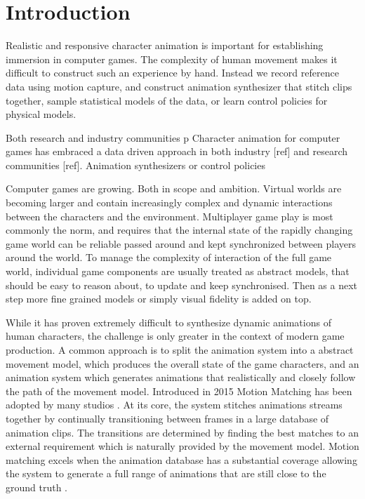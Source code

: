 \section{Introduction}
Realistic and responsive character animation is important for establishing immersion in computer games. The complexity of human movement makes it difficult to construct such an experience by hand. Instead we record reference data using motion capture, and construct animation synthesizer that stitch clips together, sample statistical models of the data, or learn control policies for physical models. 






Both research and industry communities p
Character animation for computer games has embraced a data driven approach in both industry [ref] and research communities [ref]. Animation synthesizers or control policies  



Computer games are growing. Both in scope and ambition. Virtual worlds are becoming larger and contain increasingly complex and dynamic interactions between the characters and the environment. Multiplayer game play is most commonly the norm, and requires that the internal state of the rapidly changing game world can be reliable passed around and kept synchronized between players around the world. To manage the complexity of interaction of the full game world, individual game components are usually treated as abstract models, that should be easy to reason about, to update and keep synchronised. Then as a next step more fine grained models or simply visual fidelity is added on top. 

While it has proven extremely difficult to synthesize dynamic animations of human characters, the challenge is only greater in the context of modern game production. A common approach is to split the animation system into a abstract movement model, which produces the overall state of the game characters, and an animation system which generates animations that realistically and closely follow the path of the movement model. Introduced in 2015 Motion Matching has been adopted by many studios . At its core, the system stitches animations streams together by continually transitioning between frames in a large database of animation clips. The transitions are determined by finding the best matches to an external requirement which is naturally provided by the movement model. Motion matching excels when the animation database has a substantial coverage allowing the system to generate a full range of animations that are still close to the ground truth . 

